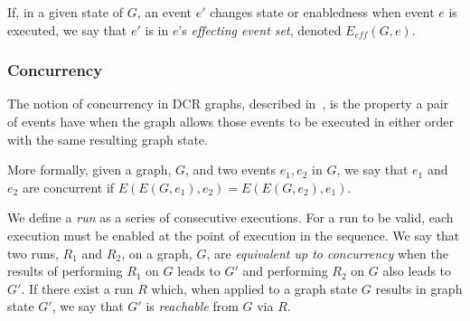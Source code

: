 \documentclass{article}
\begin{document}
			If, in a given state of $G$, an event $e'$ changes state or enabledness when event $e$ is executed, we say that $e'$ is in $e$'s \textit{effecting event set}, denoted $E_{eff}(G,e)$.

			\subsubsection{Concurrency}
			\label{subsubsec:concurrency}

			The notion of concurrency in DCR graphs, described in~\cite{debois_concurrency_2015}, is the property a pair of events have when the graph allows those events to be executed in either order with the same resulting graph state.

			More formally, given a graph, $G$, and two events $e_1, e_2$ in $G$, we say that $e_1$ and $e_2$ are concurrent if $E(E(G, e_1),e_2)=E(E(G, e_2),e_1)$.

			We define a \textit{run} as a series of consecutive executions.
			For a run to be valid, each execution must be enabled at the point of execution in the sequence.
            We say that two runs, $R_1$ and $R_2$, on a graph, $G$, are \textit{equivalent up to concurrency} when the results of performing $R_1$ on $G$ leads to $G'$ and performing $R_2$ on $G$ also leads to $G'$.
            If there exist a run $R$ which, when applied to a graph state $G$ results in graph state $G'$, we say that $G'$ is \textit{reachable} from $G$ via $R$.
\end{document}
